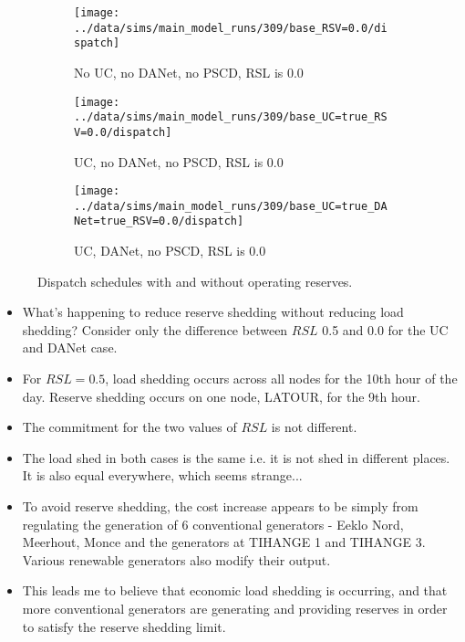 \documentclass[number,times]{elsarticle}
\begin{document}
\begin{figure}[H]
    \centering
    \begin{subfigure}[t]{0.7\textwidth}
        \centering
        \texttt{[image: ../data/sims/main\_model\_runs/309/base\_RSV=0.0/dispatch]}
        \caption{No UC, no DANet, no PSCD, RSL is 0.0}
    \end{subfigure}
    \begin{subfigure}[t]{0.7\textwidth}
        \centering
        \texttt{[image: ../data/sims/main\_model\_runs/309/base\_UC=true\_RSV=0.0/dispatch]}
        \caption{UC, no DANet, no PSCD, RSL is 0.0}
    \end{subfigure}
    \begin{subfigure}[t]{0.7\textwidth}
        \centering
        \texttt{[image: ../data/sims/main\_model\_runs/309/base\_UC=true\_DANet=true\_RSV=0.0/dispatch]}
        \caption{UC, DANet, no PSCD, RSL is 0.0}
    \end{subfigure}
    \caption{Dispatch schedules with and without operating reserves.\label{fig:dispatch_simple_reserves}}
\end{figure}

\begin{itemize}
    \item What's happening to reduce reserve shedding without reducing load shedding? Consider only the difference between $RSL$ 0.5 and 0.0 for the UC and DANet case.
    \item For $RSL = 0.5 $, load shedding occurs across all nodes for the 10th hour of the day. Reserve shedding occurs on one node, LATOUR, for the 9th hour.
    \item The commitment for the two values of $RSL$ is not different.
    \item The load shed in both cases is the same i.e. it is not shed in different places. It is also equal everywhere, which seems strange...
    \item To avoid reserve shedding, the cost increase appears to be simply from regulating the generation of 6 conventional generators - Eeklo Nord, Meerhout, Monce and the generators at TIHANGE 1 and TIHANGE 3. Various renewable generators also modify their output.
    \item This leads me to believe that economic load shedding is occurring, and that more conventional generators are generating and providing reserves in order to satisfy the reserve shedding limit.
\end{itemize}
\end{document}

